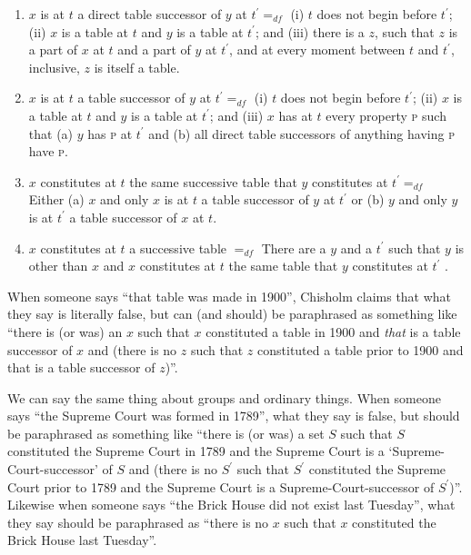 \documentclass[11pt]{article}
\begin{document}
\begin{spacing}{1.5}
\begin{enumerate}[ref=(\arabic*)]
  \item $x$ is at $t$ a direct table successor of $y$ at $t^{\prime}
    =_{df}$ (i) $t$ does not begin before $t^{\prime}$; (ii) $x$ is a
    table at $t$ and $y$ is a table at $t^{\prime}$; and (iii) there
    is a $z$, such that $z$ is a part of $x$ at $t$ and a part of $y$
    at $t^{\prime}$, and at every moment between $t$ and $t^{\prime}$,
    inclusive, $z$ is itself a table.
  \item $x$ is at $t$ a table successor of $y$ at $t^{\prime} =_{df}$
    (i) $t$ does not begin before $t^{\prime}$; (ii) $x$ is a table at
    $t$ and $y$ is a table at $t^{\prime}$; and (iii) $x$ has at $t$
    every property \textsc{p} such that (a) $y$ has \textsc{p} at
    $t^{\prime}$ and (b) all direct table successors of anything
    having \textsc{p} have \textsc{p}.
  \item $x$ constitutes at $t$ the same successive table that $y$
    constitutes at $t^{\prime} =_{df}$ Either (a) $x$ and only $x$ is
    at $t$ a table successor of $y$ at $t^{\prime}$ or (b) $y$ and
    only $y$ is at $t^{\prime}$ a table successor of $x$ at $t$.
  \item $x$ constitutes at $t$ a successive table $=_{df}$ There are a
    $y$ and a $t^{\prime}$ such that $y$ is other than $x$ and $x$
    constitutes at $t$ the same table that $y$ constitutes at
    $t^{\prime}$ \citep[99--100]{chisholm1979}.
\end{enumerate}

When someone says ``that table was made in 1900'', Chisholm claims
that what they say is literally false, but can (and should) be
paraphrased as something like ``there is (or was) an $x$ such that $x$
constituted a table in 1900 and {\em that} is a table successor of $x$
and (there is no $z$ such that $z$ constituted a table prior to 1900
and that is a table successor of $z$)''.

We can say the same thing about groups and ordinary things.  When
someone says ``the Supreme Court was formed in 1789'', what they say
is false, but should be paraphrased as something like ``there is (or
was) a set $S$ such that $S$ constituted the Supreme Court in 1789 and
the Supreme Court is a `Supreme-Court-successor' of $S$ and (there is
no $S^{\prime}$ such that $S^{\prime}$ constituted the Supreme Court
prior to 1789 and the Supreme Court is a Supreme-Court-successor of
$S^{\prime}$)''.  Likewise when someone says ``the Brick House did not
exist last Tuesday'', what they say should be paraphrased as ``there
is no $x$ such that $x$ constituted the Brick House last Tuesday''.


\end{spacing}
\end{document}
